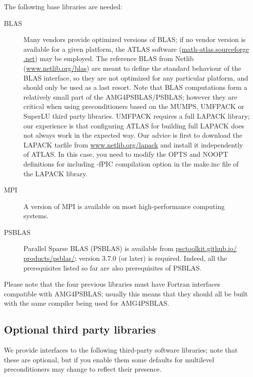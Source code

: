 The following base libraries are needed:
\begin{description}
\item[BLAS] \cite{blas3,blas2,blas1} Many vendors provide optimized versions
  of BLAS; if no vendor version is
  available for a given platform, the ATLAS software
  (\href{http://math-atlas.sourceforge.net}{math-atlas.sourceforge .net})
  may be employed.  The reference BLAS from Netlib
  (\href{http://www.netlib.org/blas}{www.netlib.org/blas}) are meant to define the standard
  behaviour of the BLAS interface, so they are not optimized for any
  particular platform, and should only be used as a last
  resort. Note that BLAS computations form a relatively small part of
  the AMG4PSBLAS/\-PSBLAS; however they are critical when using
  preconditioners based on the MUMPS, UMFPACK or SuperLU third party
  libraries. UMFPACK requires a full LAPACK library; our
experience is that configuring ATLAS for building full LAPACK does not always
work in the expected way. Our advice is first to download the LAPACK tarfile from
\href{http://www.netlib.org/lapack}{www.netlib.org/lapack} and install it independently of ATLAS. In this case,
you need to modify the OPTS and NOOPT definitions for including -fPIC compilation option
in the make.inc file of the LAPACK library.
\item[MPI] \cite{MPI2,MPI1} A version of MPI is available on most
  high-performance computing systems.
 \item[PSBLAS] \cite{PSBLASGUIDE,psblas_00} Parallel Sparse BLAS (PSBLAS) is
  available from
  \href{https://psctoolkit.github.io/products/psblas/}{psctoolkit.github.io/
    products/psblas/}; version   3.7.0  (or later) is
  required. Indeed, all the prerequisites   listed so far are also
  prerequisites of PSBLAS. 
\end{description}
Please note that the four previous libraries must have Fortran
interfaces compatible with AMG4PSBLAS; usually this means that they
should all be built with the same compiler being used for  AMG4PSBLAS.

\subsection{Optional third party libraries\label{sec:third-party}}

We provide interfaces to the following third-party software libraries;
note that these are optional, but if you enable them some defaults
for multilevel preconditioners may change to reflect their presence.

